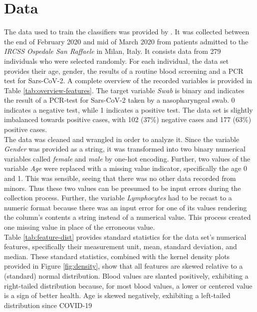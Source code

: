 \section{Data}
The data used to train the classifiers was provided by 
\citeauthor{RN127} \cite{RN127}. 
It was collected between the end of February 2020 and mid of March 2020 from 
patients admitted to the \textit{IRCSS Ospedale San Raffaele} in Milan, 
Italy. It consists data from 279 individuals who were selected randomly.
For each individual, the data set provides their age, gender, the results of a 
routine blood screening and a PCR test for Sars-CoV-2.
A complete overview of the recorded variables is provided in Table 
\ref{tab:overview-features}. The target variable \textit{Swab} is binary and 
indicates the result of a PCR-test for Sars-CoV-2 taken by a nasopharyngeal 
swab. 0 indicates a negative test, while 1 indicates a positive test.
The data set is slightly imbalanced towards positive cases, with 102 (37\%) 
negative cases and 177 (63\%) positive cases.
\\
The data was cleaned and wrangled in order to analyze it.
Since the variable \textit{Gender} 
was provided as a string, it was transformed into two binary numerical 
variables called \textit{female} and \textit{male} by one-hot encoding.
Further, two values of the variable \textit{Age} were replaced with a missing 
value indicator, specifically 
the age 0 and 1. This was sensible, seeing that there was no other 
data recorded from minors. Thus these two values can 
be presumed to be input errors during the collection process.
Further, the variable \textit{Lymphocytes} had to be recast to a numeric 
format because there was an input error for one of its 
values rendering the column's contents a string instead of a numerical 
value. This process created one missing value in place of the erroneous value.
\\
Table \ref{tab:feature-dist} provides standard statistics for the data set's 
numerical features, specifically their measurement unit, mean, standard 
deviation, and median.
These standard statistics, combined with the kernel density plots 
provided in Figure \ref{fig:density}, show that all features are skewed 
relative to a (standard) normal distribution. Blood values are 
slanted positively, exhibiting a right-tailed distribution because, for most 
blood values, a lower or centered value is a sign of better health. Age 
is skewed negatively, exhibiting a left-tailed distribution since COVID-19 

